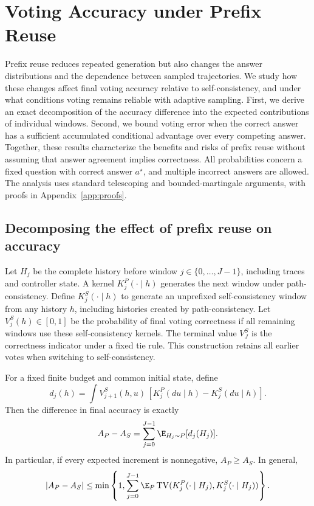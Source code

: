 \section{Voting Accuracy under Prefix Reuse}
\label{sec:theory}
Prefix reuse reduces repeated generation but also changes the answer distributions and the dependence between sampled trajectories. We study how these changes affect final voting accuracy relative to self-consistency, and under what conditions voting remains reliable with adaptive sampling. First, we derive an exact decomposition of the accuracy difference into the expected contributions of individual windows. Second, we bound voting error when the correct answer has a sufficient accumulated conditional advantage over every competing answer. Together, these results characterize the benefits and risks of prefix reuse without assuming that answer agreement implies correctness. All probabilities concern a fixed question with correct answer $a^\star$, and multiple incorrect answers are allowed. The analysis uses standard telescoping and bounded-martingale arguments, with proofs in Appendix~\ref{app:proofs}.

\subsection{Decomposing the effect of prefix reuse on accuracy}
Let $H_j$ be the complete history before window $j\in\{0,\ldots,J-1\}$, including traces and controller state. A kernel $K_j^{P}(\cdot\mid h)$ generates the next window under path-consistency. Define $K_j^{S}(\cdot\mid h)$ to generate an unprefixed self-consistency window from any history $h$, including histories created by path-consistency. Let $V_j^S(h)\in[0,1]$ be the probability of final voting correctness if all remaining windows use these self-consistency kernels. The terminal value $V_J^S$ is the correctness indicator under a fixed tie rule. This construction retains all earlier votes when switching to self-consistency.

\begin{theorem}
\label{thm:decomposition}
For a fixed finite budget and common initial state, define
\begin{equation}
 d_j(h)=\int V_{j+1}^{S}(h,u)\,
       [K_j^{P}(du\mid h)-K_j^{S}(du\mid h)].
\end{equation}
Then the difference in final accuracy is exactly
\begin{equation}
 A_P-A_S=\sum_{j=0}^{J-1}\E_{H_j\sim P}[d_j(H_j)].
 \label{eq:risk}
\end{equation}
In particular, if every expected increment is nonnegative, $A_P\geq A_S$. In general,
\begin{equation}
 |A_P-A_S|\leq
 \min\left\{1,\sum_{j=0}^{J-1}\E_P\TV(K_j^P(\cdot\mid H_j),K_j^S(\cdot\mid H_j))\right\}.
 \label{eq:tv}
\end{equation}
\end{theorem}


